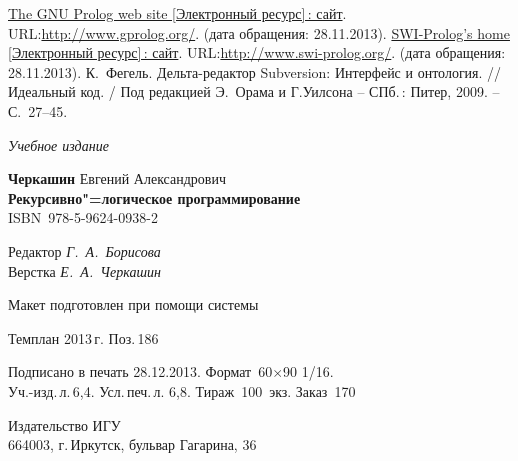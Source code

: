 \documentclass[14pt, openany, twoside, draft]{extbook} %
\def\emphbib#1{#1}
\begin{document}
\begin{thebibliography}{99}
 \emphbib{\href{http://www.gprolog.org/}{The GNU Prolog web site [Электронный ресурс]\,{}: сайт}}. URL:\url{http://www.gprolog.org/}. (дата обращения: 28.11.2013).
 \emphbib{\href{http://www.swi-prolog.org/}{SWI-Prolog's
      home [Электронный ресурс]\,{}:
      сайт}}. URL:\url{http://www.swi-prolog.org/}. (дата обращения:
  28.11.2013).
 К.~Фегель. Дельта-редактор Subversion: Интерфейс и
  онтология. // Идеальный код. / Под редакцией Э.~Орама и Г.Уилсона --
  СПб.\,: Питер, 2009. -- С.~27--45.
\end{thebibliography}
\label{lastpage}
\newpage
\thispagestyle{empty}
\mbox{}

\vfill\vfill\vfill\vfill

\hfill{}{\small\itshape Учебное издание}
\vspace{4ex}
\begin{center}
{\small\textbf{Черкашин} Евгений Александрович\\[1em]}
{\bfseries Рекурсивно"=логическое программирование}\\[1em]
ISBN~978-5-9624-0938-2
\vfill

\small
Редактор \textit{Г.~А.~Борисова}\\
Верстка \textit{Е.~А.~Черкашин}

\vfill{}
{\small Макет подготовлен при помощи системы \LuaLaTeX\\\mbox{}}
\vfill{}

Темплан 2013\,{}г. Поз.\,{}186

\end{center}
\begin{center}\small
\noindent Подписано в печать 28.12.2013.
Формат~60$\times$90 1/16.\\  %
Уч.-изд.\,{}л.\,{}6,4. Усл.\,{}печ.\,{}л. 6,8. Тираж~100~экз. Заказ~170
\end{center}
\vspace{1           ex}
\begin{center}\small
Издательство ИГУ\\{}
664003, г.\,{}Иркутск, бульвар Гагарина, 36
\end{center}
\end{document}
